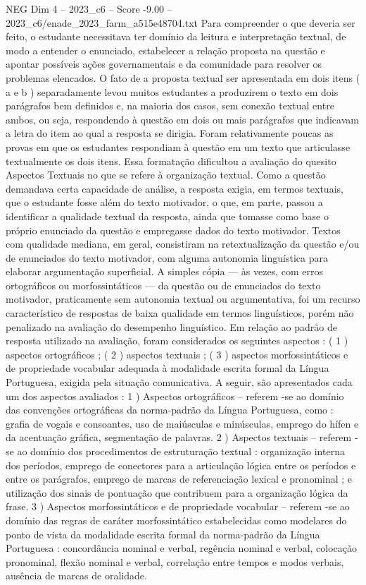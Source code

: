\begin{textsample}{NEG Dim 4 – 2023\_c6 – Score -9.00 – 2023\_c6/enade\_2023\_farm\_a515e48704.txt}
Para compreender o que deveria ser feito, o estudante necessitava ter domínio da leitura e interpretação textual, de modo a entender o enunciado, estabelecer a relação proposta na questão e apontar possíveis ações governamentais e da comunidade para resolver os problemas elencados.
O fato de a proposta textual ser apresentada em dois itens ( a e b ) separadamente levou muitos estudantes a produzirem o texto em dois parágrafos bem definidos e, na maioria dos casos, sem conexão textual entre ambos, ou seja, respondendo à questão em dois ou mais parágrafos que indicavam a letra do item ao qual a resposta se dirigia.
Foram relativamente poucas as provas em que os estudantes respondiam à questão em um texto que articulasse textualmente os dois itens.
Essa formatação dificultou a avaliação do quesito Aspectos Textuais no que se refere à organização textual.
Como a questão demandava certa capacidade de análise, a resposta exigia, em termos textuais, que o estudante fosse além do texto motivador, o que, em parte, passou a identificar a qualidade textual da resposta, ainda que tomasse como base o próprio enunciado da questão e empregasse dados do texto motivador.
Textos com qualidade mediana, em geral, consistiram na retextualização da questão e/ou de enunciados do texto motivador, com alguma autonomia linguística para elaborar argumentação superficial.
A simples cópia — às vezes, com erros ortográficos ou morfossintáticos — da questão ou de enunciados do texto motivador, praticamente sem autonomia textual ou argumentativa, foi um recurso característico de respostas de baixa qualidade em termos linguísticos, porém não penalizado na avaliação do desempenho linguístico.
Em relação ao padrão de resposta utilizado na avaliação, foram considerados os seguintes aspectos : ( 1 ) aspectos ortográficos ; ( 2 ) aspectos textuais ; ( 3 ) aspectos morfossintáticos e de propriedade vocabular adequada à modalidade escrita formal da Língua Portuguesa, exigida pela situação comunicativa.
A seguir, são apresentados cada um dos aspectos avaliados : 1 ) Aspectos ortográficos – referem -se ao domínio das convenções ortográficas da norma-padrão da Língua Portuguesa, como : grafia de vogais e consoantes, uso de maiúsculas e minúsculas, emprego do hífen e da acentuação gráfica, segmentação de palavras. 2 ) Aspectos textuais – referem -se ao domínio dos procedimentos de estruturação textual : organização interna dos períodos, emprego de conectores para a articulação lógica entre os períodos e entre os parágrafos, emprego de marcas de referenciação lexical e pronominal ; e utilização dos sinais de pontuação que contribuem para a organização lógica da frase. 3 ) Aspectos morfossintáticos e de propriedade vocabular – referem -se ao domínio das regras de caráter morfossintático estabelecidas como modelares do ponto de vista da modalidade escrita formal da norma-padrão da Língua Portuguesa : concordância nominal e verbal, regência nominal e verbal, colocação pronominal, flexão nominal e verbal, correlação entre tempos e modos verbais, ausência de marcas de oralidade.

\end{textsample}
